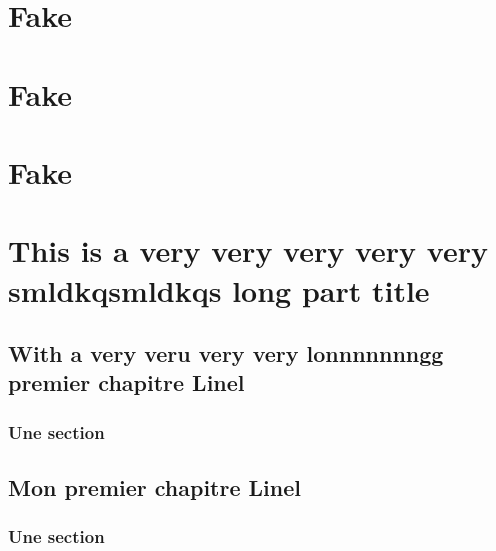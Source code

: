 \documentclass[12pt,fleqn]{thesis}
\begin{document}
\frontmatter

\setlength{\parskip}{1em}


\restoregeometry




\tableofcontents
\listoffigures
\listoftables

\mainmatter
\setlength{\parskip}{1em}

	\newrefsection

	\part{Fake}
	\part{Fake}
	\part{Fake}

	\part{This is a very very very very very smldkqsmldkqs long part title}
	\chapter{With a very veru very very lonnnnnnngg premier chapitre Linel}
	\section{Une section}
	\kant[1-10]

	
	\chapter{Mon premier chapitre Linel}
	\section{Une section}
	\kant[1-10]
	
\end{document}
